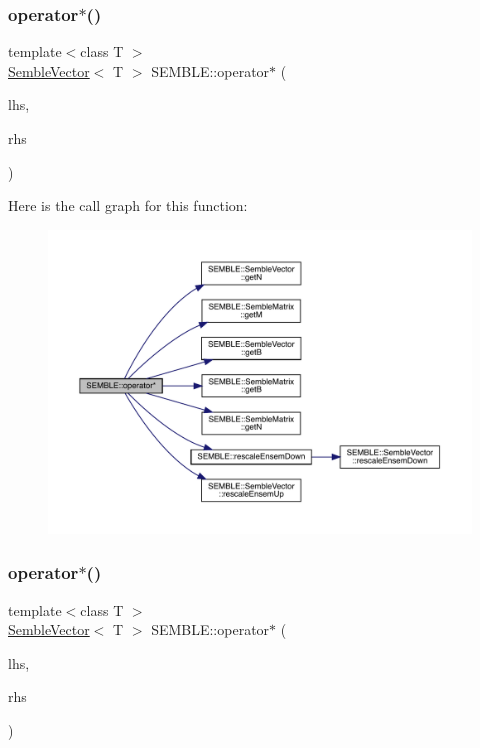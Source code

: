 \subsubsection{\texorpdfstring{operator$\ast$()}{operator*()}\hspace{0.1cm}{\footnotesize\ttfamily [2/20]}}
{\footnotesize\ttfamily template$<$class T $>$ \\
\mbox{\hyperlink{structSEMBLE_1_1SembleVector}{Semble\+Vector}}$<$ T $>$ S\+E\+M\+B\+L\+E\+::operator$\ast$ (\begin{DoxyParamCaption}\item[{const \mbox{\hyperlink{structSEMBLE_1_1SembleMatrix}{Semble\+Matrix}}$<$ T $>$ \&}]{lhs,  }\item[{const \mbox{\hyperlink{structSEMBLE_1_1SembleVector}{Semble\+Vector}}$<$ T $>$ \&}]{rhs }\end{DoxyParamCaption})}

Here is the call graph for this function\+:
\nopagebreak
\begin{figure}[H]
\begin{center}
\leavevmode
\includegraphics[width=350pt]{d7/dfd/namespaceSEMBLE_a80661aa291e6013de69fcc09abfffe9d_cgraph}
\end{center}
\end{figure}
\mbox{\label{namespaceSEMBLE_af35047ebae6e7da46390a840ba9d2440}} 
\subsubsection{\texorpdfstring{operator$\ast$()}{operator*()}\hspace{0.1cm}{\footnotesize\ttfamily [3/20]}}
{\footnotesize\ttfamily template$<$class T $>$ \\
\mbox{\hyperlink{structSEMBLE_1_1SembleVector}{Semble\+Vector}}$<$ T $>$ S\+E\+M\+B\+L\+E\+::operator$\ast$ (\begin{DoxyParamCaption}\item[{const \mbox{\hyperlink{structSEMBLE_1_1SembleVector}{Semble\+Vector}}$<$ T $>$ \&}]{lhs,  }\item[{const \mbox{\hyperlink{structSEMBLE_1_1SembleMatrix}{Semble\+Matrix}}$<$ T $>$ \&}]{rhs }\end{DoxyParamCaption})}

